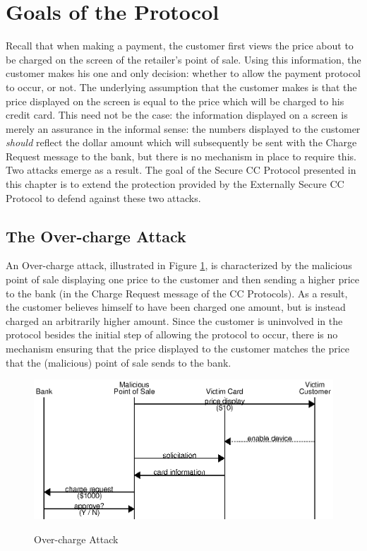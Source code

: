 \section{Goals of the Protocol}
\label{sec:secure-goals}

Recall that when making a payment, the customer first views the price about to be charged on the screen of the retailer's point of sale.
Using this information, the customer makes his one and only decision: whether to allow the payment protocol to occur, or not.
The underlying assumption that the customer makes is that the price displayed on the screen is equal to the price which will be charged to his credit card.
This need not be the case: the information displayed on a screen is merely an assurance in the informal sense:
	the numbers displayed to the customer \emph{should} reflect the dollar amount which will subsequently be sent with the Charge Request message to the bank,
    but there is no mechanism in place to require this.
Two attacks emerge as a result.
The goal of the Secure CC Protocol presented in this chapter is to extend the protection provided by the Externally Secure CC Protocol to defend against these two attacks.

\subsection{The Over-charge Attack}

An Over-charge attack, illustrated in Figure \ref{fig:attack_overcharge}, is characterized by the malicious point of sale displaying one price to the customer
	and then sending a higher price to the bank
	(in the Charge Request message of the CC Protocols).
As a result, the customer believes himself to have been charged one amount, but is instead charged an arbitrarily higher amount.
Since the customer is uninvolved in the protocol besides the initial step of allowing the protocol to occur,
	there is no mechanism ensuring that the price displayed to the customer matches the price that the (malicious) point of sale sends to the bank.

\begin{figure}
  \caption{Over-charge Attack}
  \centering
    \includegraphics{img/attack-mr-overcharge.eps}
  \label{fig:attack_overcharge}
\end{figure}

